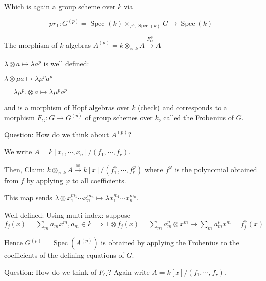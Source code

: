 \documentclass{article}
\theoremstyle{definition}
\numberwithin{theorem}{subsection}
\begin{document}
    Which is again a group scheme over \(k\) via

    \[
        pr_1: G^{(p)} = \operatorname{Spec}(k) \times_{\varphi^a, \operatorname{Spec}(k)} G \to \operatorname{Spec}(k)
    \]

    The morphism of \(k\)-algebras \(A^{(p)} = k \otimes_{\varphi , k} A \xrightarrow{F_G^\#} A\)
    
    \(\lambda \otimes a \mapsto \lambda a^p\) is well defined:

    \(\lambda \otimes \mu a \mapsto \lambda \mu^p a ^p\)

    \(= \lambda \mu^p .\otimes a \mapsto \lambda \mu ^p a^p\)
    
    and is a morphism of Hopf algebras over \(k\) (check) and corresponds to a morphism \(F_G: G \to G^{(p)}\) of group schemes over \(k\), called \underline{the Frobenius} of \(G\).

    Question: How do we think about \(A^{(p)}\)?

    We write \(A = k[x_1, \cdots , x_n] / (f_1, \cdots , f_r)\).

    Then, Claim: \(k \otimes_{\varphi, k} A \xrightarrow{\cong} k[x] / (f_1^{\varphi}, \cdots , f_r^{\varphi})\) where \(f^\varphi\) is the polynomial obtained from \(f\) by applying \(\varphi\) to all coefficients.

    This map sends \(\lambda \otimes x_1^{m_1} \cdots x_n^{m_n} \mapsto \lambda x_1^{m_1} \cdots x_n^{m_n}\).
    
    Well defined: Using multi index: suppose \(f_j(x) = \sum_{m} a_m x^m, a_m \in k \implies 1 \otimes f_j(x) = \sum_{m} a_m^p \otimes x^m \mapsto \sum_{m} a_m^p x^m = f_j^\varphi(x)\) 

    Hence \(G^{(p)} = \operatorname{Spec}(A^{(p)})\) is obtained by applying the Frobenius to the coefficients of the defining equations of \(G\).

    Question: How do we think of \(F_G\)? Again write \(A = k[x] / (f_1, \cdots , f_r)\).

    \begin{center}
    \end{center}
\end{document}
